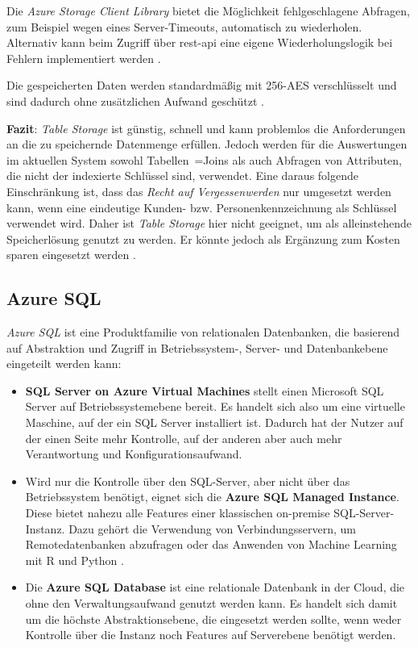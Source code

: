 Die \textit{Azure Storage Client Library} bietet die Möglichkeit fehlgeschlagene Abfragen, zum Beispiel wegen eines Server-Timeouts, automatisch zu wiederholen. Alternativ kann beim Zugriff über \ac{rest}-\ac{api} eine eigene Wiederholungslogik bei Fehlern implementiert werden \cite{reagan_web_2018}. 

Die gespeicherten Daten werden standardmäßig mit 256-AES verschlüsselt und sind dadurch ohne zusätzlichen Aufwand geschützt \cite{soh_microsoft_2020}.

\textbf{Fazit}: \textit{Table Storage} ist günstig, schnell und kann problemlos die Anforderungen an die zu speichernde Datenmenge erfüllen. Jedoch werden für die Auswertungen im aktuellen System sowohl Tabellen~=Joins als auch Abfragen von Attributen, die nicht der indexierte Schlüssel sind, verwendet. Eine daraus folgende Einschränkung ist, dass das \textit{Recht auf Vergessenwerden} nur umgesetzt werden kann, wenn eine eindeutige Kunden- bzw. Personenkennzeichnung als Schlüssel verwendet wird. Daher ist \textit{Table Storage} hier nicht geeignet, um als alleinstehende Speicherlösung genutzt zu werden. Er könnte jedoch als Ergänzung zum Kosten sparen eingesetzt werden \cite[vgl.][]{reagan_web_2018}. 


\subsection{Azure SQL} \label{sec:grundlagen:azure_dienste:sql}
\textit{Azure SQL} ist eine Produktfamilie von relationalen Datenbanken, die basierend auf Abstraktion und Zugriff in Betriebssystem-, Server- und Datenbankebene eingeteilt werden kann\cite{mauri_practical_2021}:

\begin{itemize}
\item \textbf{SQL Server on Azure Virtual Machines} stellt einen Microsoft SQL Server auf Betriebssystemebene bereit. Es handelt sich also um eine virtuelle Maschine, auf der ein SQL Server installiert ist. Dadurch hat der Nutzer auf der einen Seite mehr Kontrolle, auf der anderen aber auch mehr Verantwortung und Konfigurationsaufwand. 
\item Wird nur die Kontrolle über den SQL-Server, aber nicht über das Betriebssystem benötigt, eignet sich die \textbf{Azure SQL Managed Instance}. Diese bietet nahezu alle Features einer klassischen on-premise SQL-Server-Instanz. Dazu gehört die Verwendung von Verbindungsservern, um Remotedatenbanken abzufragen \cite{msdoc_21_sqlMI_tsql} oder das Anwenden von Machine Learning mit R und Python \cite{msdoc_21_sqlMachineLearningServices}.
\item Die \textbf{Azure SQL Database} ist eine relationale Datenbank in der Cloud, die ohne den Verwaltungsaufwand genutzt werden kann. Es handelt sich damit um die höchste Abstraktionsebene, die eingesetzt werden sollte, wenn weder Kontrolle über die Instanz noch Features auf Serverebene benötigt werden.
\end{itemize}

